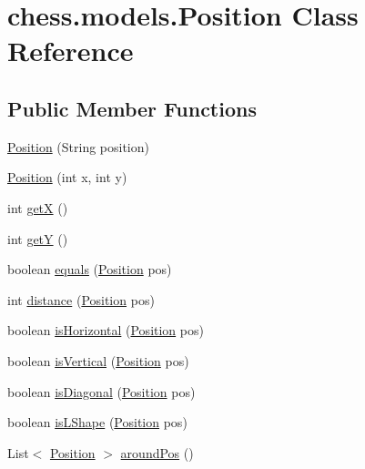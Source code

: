 \hypertarget{classchess_1_1models_1_1_position}{}\section{chess.\+models.\+Position Class Reference}
\label{classchess_1_1models_1_1_position}
\subsection*{Public Member Functions}
\begin{DoxyCompactItemize}
\item 
\mbox{\hyperlink{classchess_1_1models_1_1_position_af2ca0e2b74a18503f08e8492a52501c1}{Position}} (String position)
\item 
\mbox{\hyperlink{classchess_1_1models_1_1_position_aa5e15407a249f22ba683d43083c3f16b}{Position}} (int x, int y)
\item 
int \mbox{\hyperlink{classchess_1_1models_1_1_position_a1de14ed4ac5e2376caf3ecbf4f415e38}{getX}} ()
\item 
int \mbox{\hyperlink{classchess_1_1models_1_1_position_aa4cdabf057a4a9fac849b04dc687a8ed}{getY}} ()
\item 
boolean \mbox{\hyperlink{classchess_1_1models_1_1_position_ab66e53b6cb98e557aa0fc811e7987486}{equals}} (\mbox{\hyperlink{classchess_1_1models_1_1_position}{Position}} pos)
\item 
int \mbox{\hyperlink{classchess_1_1models_1_1_position_ad2ac6e3457056ccba6f1ccf3603f2554}{distance}} (\mbox{\hyperlink{classchess_1_1models_1_1_position}{Position}} pos)
\item 
boolean \mbox{\hyperlink{classchess_1_1models_1_1_position_a5fdc417a5c9eed00af982d202b505767}{is\+Horizontal}} (\mbox{\hyperlink{classchess_1_1models_1_1_position}{Position}} pos)
\item 
boolean \mbox{\hyperlink{classchess_1_1models_1_1_position_a50da6933e82356a80b6f012251189d25}{is\+Vertical}} (\mbox{\hyperlink{classchess_1_1models_1_1_position}{Position}} pos)
\item 
boolean \mbox{\hyperlink{classchess_1_1models_1_1_position_a359f1be865e9ba19dc94116ce1fe8214}{is\+Diagonal}} (\mbox{\hyperlink{classchess_1_1models_1_1_position}{Position}} pos)
\item 
boolean \mbox{\hyperlink{classchess_1_1models_1_1_position_a7e79c1169c4333aa98d6445af82ea5e2}{is\+L\+Shape}} (\mbox{\hyperlink{classchess_1_1models_1_1_position}{Position}} pos)
\item 
List$<$ \mbox{\hyperlink{classchess_1_1models_1_1_position}{Position}} $>$ \mbox{\hyperlink{classchess_1_1models_1_1_position_a86f1df8c1f1a5303a0bb0386c5181eef}{around\+Pos}} ()
\end{DoxyCompactItemize}


